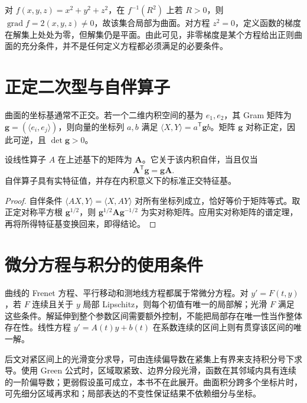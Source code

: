 \documentclass[UTF8,12pt,a4paper,fontset=fandol]{ctexbook}
\newcommand{\ip}[2]{\langle #1,#2\rangle}
\DeclareMathOperator{\grad}{grad}
\begin{document}
\begin{example}[隐式球面与失效的判别条件]
对 $f(x,y,z)=x^2+y^2+z^2$，在 $f^{-1}(R^2)$ 上若 $R>0$，则 $\grad f=2(x,y,z)\ne0$，故该集合局部为曲面。对方程 $z^2=0$，定义函数的梯度在解集上处处为零，但解集仍是平面。由此可见，非零梯度是某个方程给出正则曲面的充分条件，并不是任何定义方程都必须满足的必要条件。
\end{example}

\section{正定二次型与自伴算子}
曲面的坐标基通常不正交。若一个二维内积空间的基为 $e_1,e_2$，其 Gram 矩阵为 $\mathbf g=(\ip{e_i}{e_j})$，则向量的坐标列 $a,b$ 满足 $\ip XY=a^{\mathsf T}\mathbf g b$。矩阵 $\mathbf g$ 对称正定，因此可逆，且 $\det\mathbf g>0$。

\begin{proposition}[非正交基下的自伴性]
设线性算子 $A$ 在上述基下的矩阵为 $\mathbf A$。它关于该内积自伴，当且仅当
\[
 \mathbf A^{\mathsf T}\mathbf g=\mathbf g\mathbf A.
\]
自伴算子具有实特征值，并存在内积意义下的标准正交特征基。
\label{prop:dg-selfadjoint}
\end{proposition}
\begin{proof}
自伴条件 $\ip{AX}{Y}=\ip{X}{AY}$ 对所有坐标列成立，恰好等价于矩阵等式。取正定对称平方根 $\mathbf g^{1/2}$，则 $\mathbf g^{1/2}\mathbf A\mathbf g^{-1/2}$ 为实对称矩阵。应用实对称矩阵的谱定理，再将所得特征基变换回来，即得结论。
\end{proof}

\section{微分方程与积分的使用条件}
曲线的 Frenet 方程、平行移动和测地线方程都属于常微分方程。对 $y'=F(t,y)$，若 $F$ 连续且关于 $y$ 局部 Lipschitz，则每个初值有唯一的局部解；光滑 $F$ 满足这些条件。解延伸到整个参数区间需要额外控制，不能把局部存在唯一性当作整体存在性。线性方程 $y'=A(t)y+b(t)$ 在系数连续的区间上则有贯穿该区间的唯一解。

后文对紧区间上的光滑变分求导，可由连续偏导数在紧集上有界来支持积分号下求导。使用 Green 公式时，区域取紧致、边界分段光滑，函数在其邻域内具有连续的一阶偏导数；更弱假设虽可成立，本书不在此展开。曲面积分跨多个坐标片时，可先细分区域再求和；局部表达的不变性保证结果不依赖细分与坐标。
\end{document}
